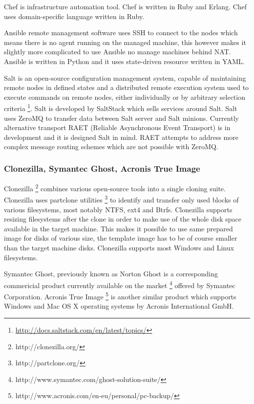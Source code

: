 \documentclass{article}
\begin{document}
Chef is infrastructure automation tool. Chef is written in Ruby and Erlang. Chef uses domain-specific language written in Ruby.

Ansible remote management software uses SSH to connect to the nodes which
means there is no agent running on the managed machine, this however makes
it slightly more complicated to use Ansible no manage machines behind NAT.
Ansible is written in Python and it uses state-driven resource 
written in YAML.

Salt is an open-source configuration management system,
capable of maintaining remote nodes in defined states and 
a distributed remote execution system used to execute commands
on remote nodes, either individually or by arbitrary selection criteria
\footnote{\url{http://docs.saltstack.com/en/latest/topics/}}.
Salt is developed by SaltStack which sells services around Salt.
Salt uses ZeroMQ to transfer data between Salt server and
Salt minions.
Currently alternative transport
RAET (Reliable Asynchronous Event Transport)
is in development and it is designed Salt in mind.
RAET attempts to address more complex message routing
schemes which are not possible with ZeroMQ.




\subsubsection{Clonezilla, Symantec Ghost, Acronis True Image}

Clonezilla \footnote{http://clonezilla.org/}
combines various open-source tools into a single cloning suite.
Clonezilla uses partclone utilities \footnote{http://partclone.org/} to
identify and transfer only used blocks of various filesystems, most notably
NTFS, ext4 and Btrfs.
Clonezilla supports resizing filesystems after the clone
in order to make use of the whole disk space available
in the target machine.
This makes it possible to use same prepared image for disks of
various size, the template image has to be of course smaller
than the target machine disks.
Clonezilla supports most Windows and Linux filesystems.

Symantec Ghost, previously known as Norton Ghost is a corresponding commericial
product currently available on the market
\footnote{http://www.symantec.com/ghost-solution-suite/}
offered by Symantec Corporation.
Acronis True Image
\footnote{http://www.acronis.com/en-eu/personal/pc-backup/}
is another similar product which supports Windows
and Mac OS X operating systems by Acronis International GmbH.
\end{document}
